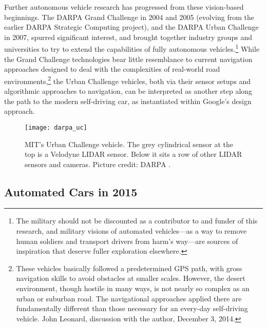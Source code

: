 

Further autonomous vehicle research has progressed from
these vision-based beginnings. The
DARPA Grand Challenge in 2004 and 2005 (evolving from the earlier
  DARPA Strategic Computing project), and the DARPA Urban Challenge 
in 2007, spurred significant interest, and brought together industry
groups and universities to 
try to extend the capabilities of fully autonomous vehicles.\footnote{The
military should not be discounted as a contributor to and funder of
  this research, and military visions of automated vehicles---as a way
  to remove human soldiers and transport drivers from harm's way---are
  sources of inspiration that deserve fuller
  exploration elsewhere.} While the
Grand Challenge technologies bear little resemblance to current
navigation approaches designed to deal with the complexities of
real-world road environments,\footnote{These vehicles basically
  followed a predetermined GPS path, with gross navigation skills to
  avoid obstacles at smaller scales. However, the desert environment,
  though hostile in many ways, is not nearly so complex as an urban or
suburban road. The navigational approaches applied there are
fundamentally different than those necessary for an every-day
self-driving vehicle. John Leonard,
  discussion with the author, December 3, 2014.} the Urban Challenge
vehicles, both via their sensor setups and algorithmic approaches to
navigation, can be interpreted as another step along the path to the
modern self-driving car, as instantiated within Google's design
approach. 

\begin{figure}[h]
  \caption{MIT's Urban Challenge vehicle. The grey cylindrical sensor
    at the top is a Velodyne LIDAR sensor. Below it sits a row of other
    LIDAR sensors and cameras. Picture credit: DARPA \cite{DARPAUC}.}
  \centering
  \texttt{[image: darpa\_uc]}
\end{figure}

\subsection{Automated Cars in 2015}

